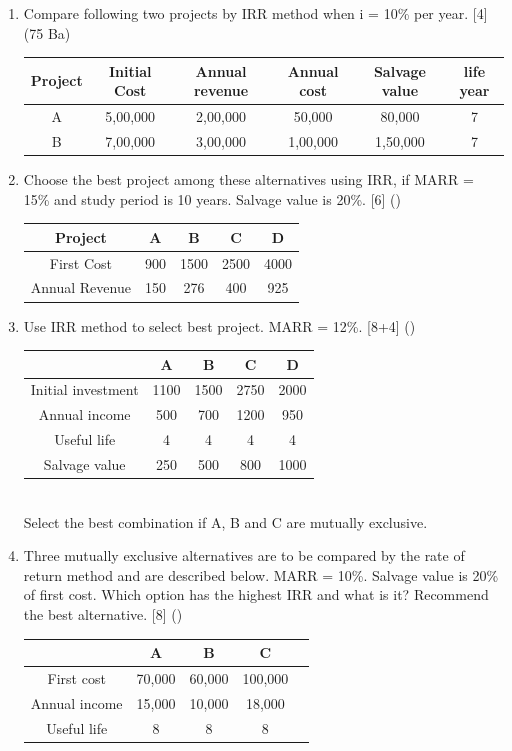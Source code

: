 \documentclass[12pt]{article}
\begin{document}
\begin{enumerate}
			\item Compare following two projects by IRR method when i = 10\% per year. \hfill [4] (75 Ba)\\
			\begin{tabular}{|c|c|c|c|c|c|}
				\hline
				Project & Initial Cost & Annual revenue & Annual cost & Salvage value & life year\\ \hline
				A & 5,00,000 & 2,00,000 & 50,000 & 80,000 & 7 \\ \hline
				B & 7,00,000 & 3,00,000 & 1,00,000 & 1,50,000 & 7 \\ \hline
			\end{tabular}
			
			\item Choose the best project among these alternatives using IRR, if MARR = 15\% and study period is 10 years. Salvage value is 20\%. \hfill [6] ()\\
			\begin{tabular}{|c|c|c|c|c|}
				\hline
				Project & A & B & C & D \\ \hline
				First Cost & 900 & 1500 & 2500 & 4000 \\ \hline
				Annual Revenue & 150 & 276 & 400 & 925 \\ \hline
			\end{tabular}
			
			\item Use IRR method to select best project. MARR = 12\%. \hfill [8+4] ()
			\begin{tabular}{|c|c|c|c|c|}
				\hline
				& A & B & C & D \\ \hline
				Initial investment & 1100 & 1500 & 2750 & 2000 \\ \hline
				Annual income & 500 & 700 & 1200 & 950 \\ \hline
				Useful life & 4 & 4 & 4 & 4 \\ \hline
				Salvage value & 250 & 500 & 800 & 1000 \\ \hline
			\end{tabular}\\
			Select the best combination if A, B and C are mutually exclusive.
			
			\item Three mutually exclusive alternatives are to be compared by the rate of return method and are described below. MARR = 10\%. Salvage value is 20\% of first cost. Which option has the highest IRR and what is it? Recommend the best alternative. \hfill [8] ()\\
			\begin{tabular}{|c|c|c|c|c|}
				\hline
				& A & B & C \\ \hline
				First cost & 70,000 & 60,000 & 100,000 \\ \hline
				Annual income & 15,000 & 10,000 & 18,000 \\ \hline
				Useful life & 8 & 8 & 8 \\ \hline
			\end{tabular}


\end{enumerate}
\end{document}
